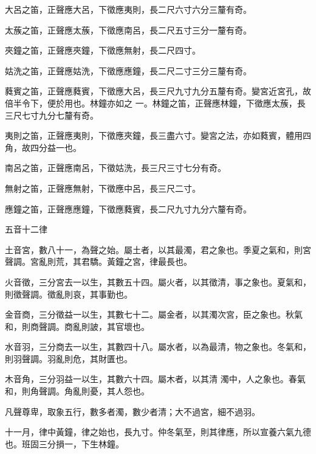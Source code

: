 \begin{pinyinscope}
 大呂之笛，正聲應大呂，下徵應夷則，長二尺六寸六分三釐有奇。



 太蔟之笛，正聲應太蔟，下徵應南呂，長二尺五寸三分一釐有奇。



 夾鐘之笛，正聲應夾鐘，下徵應無射，長二尺四寸。



 姑洗之笛，正聲應姑洗，下徵應應鐘，長二尺二寸三分三釐有奇。



 蕤賓之笛，正聲應蕤賓，下徵應大呂，長三尺九寸九分五釐有奇。變宮近宮孔，故倍半令下，便於用也。林鐘亦如之
 一。林鐘之笛，正聲應林鐘，下徵應太蔟，長三尺七寸九分七釐有奇。



 夷則之笛，正聲應夷則，下徵應夾鐘，長三盡六寸。變宮之法，亦如蕤賓，體用四角，故四分益一也。



 南呂之笛，正聲應南呂，下徵姑洗，長三尺三寸七分有奇。



 無射之笛，正聲應無射，下徵應中呂，長三尺二寸。



 應鐘之笛，正聲應應鐘，下徵應蕤賓，長二尺九寸九分六釐有奇。



 五音十二律



 土音宮，數八十一，為聲之始。屬土者，以其最濁，君之象也。季夏之氣和，則宮聲調。宮亂則荒，其君驕。黃鐘之宮，律最長也。



 火音徵，三分宮去一以生，其數五十四。屬火者，以其徵清，事之象也。夏氣和，則徵聲調。徵亂則哀，其事勤也。



 金音商，三分徵益一以生，其數七十二。屬金者，以其濁次宮，臣之象也。秋氣和，則商聲調。商亂則詖，其官壞也。



 水音羽，三分商去一以生，其數四十八。屬水者，以為最清，物之象也。冬氣和，則羽聲調。羽亂則危，其財匱也。



 木音角，三分羽益一以生，其數六十四。屬木者，以其清
 濁中，人之象也。春氣和，則角聲調。角亂則憂，其人怨也。



 凡聲尊卑，取象五行，數多者濁，數少者清；大不過宮，細不過羽。



 十一月，律中黃鐘，律之始也，長九寸。仲冬氣至，則其律應，所以宣養六氣九德也。班固三分損一，下生林鐘。




\end{pinyinscope}
